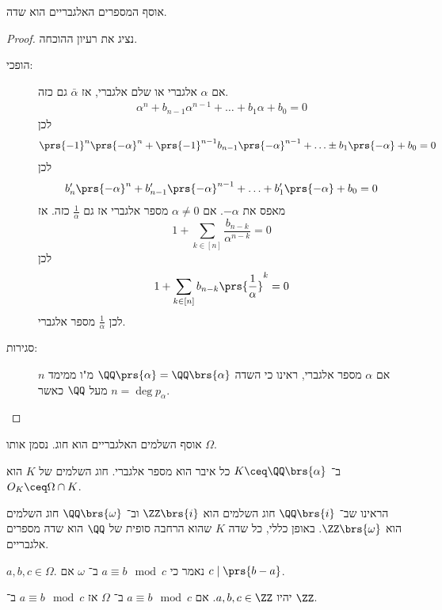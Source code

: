 \documentclass[a4paper,10pt,twoside,openany]{book}
\begin{document}
\begin{theorem}
אוסף המספרים האלגבריים הוא שדה.
\end{theorem}

\begin{proof}
נציג את רעיון ההוכחה.

\begin{description}

\item[הופכי:]
אם
$\alpha$
אלגברי או שלם אלגברי, אז
$\bar{\alpha}$
גם כזה.
\begin{align*}
\alpha^n + b_{n-1}\alpha^{n-1} + \ldots + b_1 \alpha + b_0 =0
\end{align*}
לכן
\begin{align*}
\prs{-1}^n \prs{-\alpha}^n + \prs{-1}^{n-1} b_{n-1}\prs{-\alpha}^{n-1} + \ldots \pm b_1 \prs{-\alpha} + b_0 = 0
\end{align*}
לכן
\[b_n' \prs{-\alpha}^n + b_{n-1}' \prs{-\alpha}^{n-1} + \ldots + b_1'\prs{-\alpha} + b_0 = 0\]
מאפס את
$-\alpha$.
אם
$\alpha \neq 0$
מספר אלגברי אז גם
$\frac{1}{\alpha}$
כזה.
אז
\[1 + \sum_{k\in[n]} \frac{b_{n-k}}{\alpha^{n-k}} = 0\]
לכן
\[1+ \sum_{k \in [n]} b_{n-k} \prs{\frac{1}{\alpha}}^k = 0\]
לכן
$\frac{1}{\alpha}$
מספר אלגברי.
\item[סגירות:]
אם
$\alpha$
מספר אלגברי, ראינו כי השדה
$\QQ\prs{\alpha} = \QQ\brs{\alpha}$
מ"ו ממימד
$n$
מעל
$\QQ$
כאשר
$n = \deg p_{\alpha}$.
\end{description}
\end{proof}

\begin{theorem}
אוסף השלמים האלגבריים הוא חוג. נסמן אותו
$\Omega$.
\end{theorem}

\begin{corollary}
ב־%
$K \ceq \QQ\brs{\alpha}$
כל איבר הוא מספר אלגברי.
חוג השלמים של
$K$
הוא
$O_K \ceq \Omega \cap K$.
\end{corollary}
\begin{example}
הראינו שב־%
$\QQ\brs{i}$
חוג השלמים הוא
$\ZZ\brs{i}$
וב־%
$\QQ\brs{\omega}$
חוג השלמים הוא
$\ZZ\brs{\omega}$.
באופן כללי, כל שדה
$K$
שהוא הרחבה סופית של
$\QQ$
הוא שדה מספרים אלגבריים.
\end{example}

\begin{definition}
$a,b,c \in \Omega$.
נאמר כי
$a \equiv b \mod{c}$
ב־%
$\omega$
אם
$c \mid \prs{b-a}$.
\end{definition}
\begin{proposition}
יהיו
$a,b,c \in \ZZ$.
אם
$a \equiv b \mod{c}$
ב־%
$\Omega$
אז
$a \equiv b \mod{c}$
ב־%
$\ZZ$.
\end{proposition}
\end{document}
